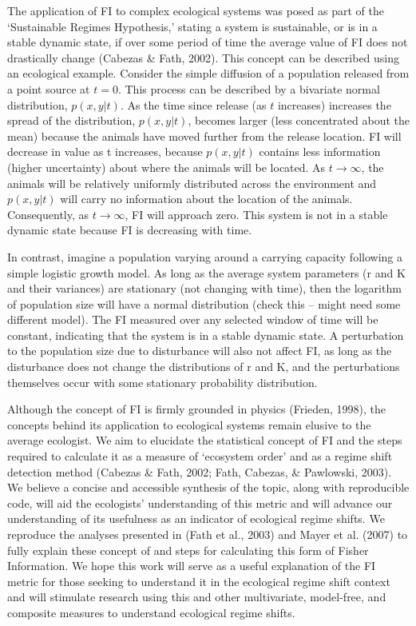 \documentclass[12pt,twoside]{reedthesis}
\begin{document}
The application of FI to complex ecological systems was posed as part of the `Sustainable Regimes Hypothesis,' stating a system is sustainable, or is in a stable dynamic state, if over some period of time the average value of FI does not drastically change (Cabezas \& Fath, 2002). This concept can be described using an ecological example. Consider the simple diffusion of a population released from a point source at \(t = 0\). This process can be described by a bivariate normal distribution, \(p(x,y\vert t)\). As the time since release (as \(t\) increases) increases the spread of the distribution, \(p(x,y\vert t)\), becomes larger (less concentrated about the mean) because the animals have moved further from the release location. FI will decrease in value as t increases, because \(p(x,y\vert t)\) contains less information (higher uncertainty) about where the animals will be located. As \(t→\infty\), the animals will be relatively uniformly distributed across the environment and \(p(x,y\vert t)\) will carry no information about the location of the animals. Consequently, as \(t→\infty\), FI will approach zero. This system is not in a stable dynamic state because FI is decreasing with time.

In contrast, imagine a population varying around a carrying capacity following a simple logistic growth model. As long as the average system parameters (r and K and their variances) are stationary (not changing with time), then the logarithm of population size will have a normal distribution (check this -- might need some different model). The FI measured over any selected window of time will be constant, indicating that the system is in a stable dynamic state. A perturbation to the population size due to disturbance will also not affect FI, as long as the disturbance does not change the distributions of r and K, and the perturbations themselves occur with some stationary probability distribution.

Although the concept of FI is firmly grounded in physics (Frieden, 1998), the concepts behind its application to ecological systems remain elusive to the average ecologist. We aim to elucidate the statistical concept of FI and the steps required to calculate it as a measure of `ecosystem order' and as a regime shift detection method (Cabezas \& Fath, 2002; Fath, Cabezas, \& Pawlowski, 2003). We believe a concise and accessible synthesis of the topic, along with reproducible code, will aid the ecologists' understanding of this metric and will advance our understanding of its usefulness as an indicator of ecological regime shifts. We reproduce the analyses presented in (Fath et al., 2003) and Mayer et al. (2007) to fully explain these concept of and steps for calculating this form of Fisher Information. We hope this work will serve as a useful explanation of the FI metric for those seeking to understand it in the ecological regime shift context and will stimulate research using this and other multivariate, model-free, and composite measures to understand ecological regime shifts.
\end{document}
